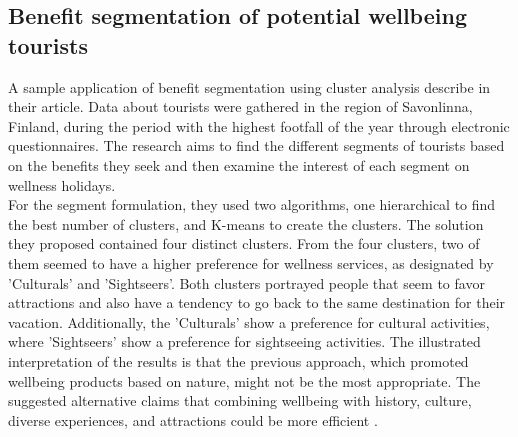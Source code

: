 \subsection{Benefit segmentation of potential wellbeing tourists}
A sample application of benefit segmentation using cluster analysis describe \textcite{finland} in their article. Data about tourists were gathered in the region of Savonlinna, Finland, during the period with the highest footfall of the year through electronic questionnaires. The research aims to find the different segments of tourists based on the benefits they seek and then examine the interest of each segment on wellness holidays. \\
For the segment formulation, they used two algorithms, one hierarchical to find the best number of clusters, and K-means to create the clusters. The solution they proposed contained four distinct clusters. From the four clusters, two of them seemed to have a higher preference for wellness services, as designated by \textcite{finland} 'Culturals' and 'Sightseers'. Both clusters portrayed people that seem to favor attractions and also have a tendency to go back to the same destination for their vacation. Additionally, the 'Culturals' show a preference for cultural activities, where 'Sightseers' show a preference for sightseeing activities. The illustrated interpretation of the results is that the previous approach, which promoted wellbeing products based on nature, might not be the most appropriate. The suggested alternative claims that combining wellbeing with history, culture, diverse experiences, and attractions could be more efficient \autocite[308-312]{finland}. \\
